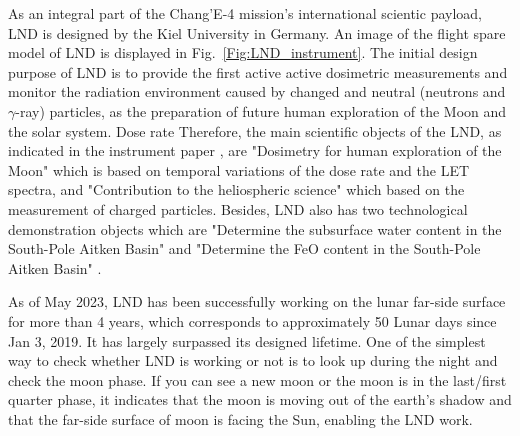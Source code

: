As an integral part of the Chang'E-4 mission's international scientic payload, \acl{LND} is designed by the Kiel University in Germany. An image of the flight spare model of \ac{LND} is displayed in Fig.~\ref{Fig:LND_instrument}. 
The initial design purpose of \ac{LND} is to provide the first active active
dosimetric measurements and monitor the radiation environment caused by changed and neutral (neutrons and $\gamma$-ray) particles, as the preparation of future human exploration of the Moon and the solar system. Dose rate
Therefore, the main scientific objects of the \ac{LND}, as indicated in the instrument paper \citep{Wimmer-2020-LND}, are "Dosimetry for human exploration of the Moon" which is based on temporal variations of the dose rate and the \ac{LET} spectra, and "Contribution to the heliospheric science" which based on the measurement of charged particles.
Besides, \ac{LND} also has two technological demonstration objects which are "Determine the subsurface water content in the South-Pole Aitken Basin" and "Determine the FeO content in the South-Pole Aitken Basin" \citep{Wimmer-2020-LND}.

As of May 2023, \ac{LND} has been successfully working on the lunar far-side surface for more than 4 years, which corresponds to approximately 50 Lunar days since Jan 3, 2019. It has largely surpassed its designed lifetime.
One of the simplest way to check whether LND is working or not is to look up during the night and check the moon phase. If you can see a new moon or the moon is in the last/first quarter phase, it indicates that the moon is moving out of the earth's shadow and that the far-side surface of moon is facing the Sun, enabling the \ac{LND} work.

